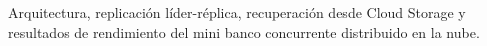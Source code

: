 \documentclass[12pt]{article}
\begin{document}
  {Arquitectura, replicación líder-réplica, recuperación desde Cloud Storage
   y resultados de rendimiento del mini banco concurrente distribuido en la nube.}
\end{document}
